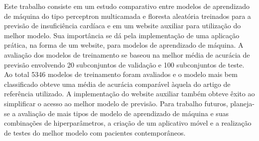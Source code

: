 Este trabalho consiste em um estudo comparativo entre modelos de aprendizado de máquina do tipo perceptron multicamada e floresta aleatória treinados para a previsão de insuficiência cardíaca e em um website auxiliar para utilização do melhor modelo. Sua importância se dá pela implementação de uma aplicação prática, na forma de um website, para modelos de aprendizado de máquina. A avaliação dos modelos de treinamento se baseou na melhor média de acurácia de previsão envolvendo 20 subconjuntos de validação e 100 subconjuntos de teste. Ao total 5346 modelos de treinamento foram avaliados e o modelo mais bem classificado obteve uma média de acurácia comparável àquela do artigo de referência utilizado. A implementação do website auxiliar também obteve êxito ao simplificar o acesso ao melhor modelo de previsão. Para trabalho futuros, planeja-se a avaliação de mais tipos de modelo de aprendizado de máquina e suas combinações de hiperparâmetros, a criação de um aplicativo móvel e a realização de testes do melhor modelo com pacientes contemporâneos.

